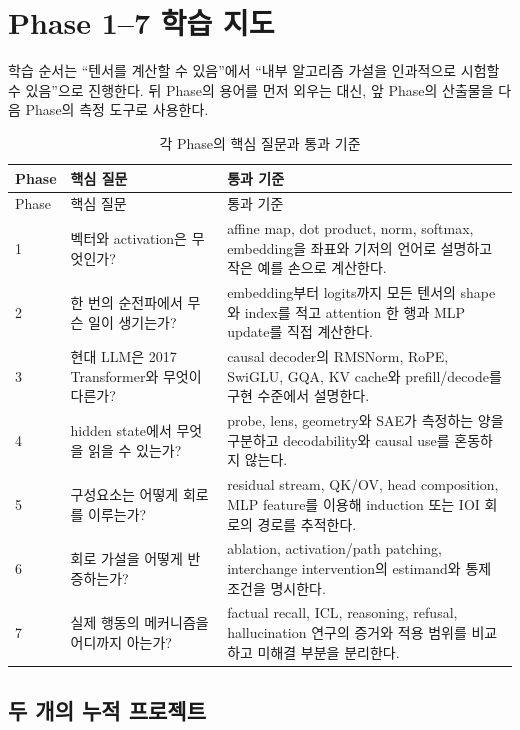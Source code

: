 \chapter*{Phase 1--7 학습 지도}

\begin{factbox}
학습 순서는 ``텐서를 계산할 수 있음''에서 ``내부 알고리즘 가설을 인과적으로 시험할 수 있음''으로 진행한다.
뒤 Phase의 용어를 먼저 외우는 대신, 앞 Phase의 산출물을 다음 Phase의 측정 도구로 사용한다.
\end{factbox}

\begin{longtable}{@{}p{}p{}p{}@{}}
\caption{각 Phase의 핵심 질문과 통과 기준}\label{tab:phase-roadmap}\\
\toprule
Phase & 핵심 질문 & 통과 기준 \\
\midrule
\endfirsthead
\toprule
Phase & 핵심 질문 & 통과 기준 \\
\midrule
\endhead
1 & 벡터와 activation은 무엇인가? & affine map, dot product, norm, softmax,
embedding을 좌표와 기저의 언어로 설명하고 작은 예를 손으로 계산한다. \\
2 & 한 번의 순전파에서 무슨 일이 생기는가? & embedding부터 logits까지 모든
텐서의 shape와 index를 적고 attention 한 행과 MLP update를 직접 계산한다. \\
3 & 현대 LLM은 2017 Transformer와 무엇이 다른가? & causal decoder의
RMSNorm, RoPE, SwiGLU, GQA, KV cache와 prefill/decode를 구현 수준에서 설명한다. \\
4 & hidden state에서 무엇을 읽을 수 있는가? & probe, lens, geometry와 SAE가
측정하는 양을 구분하고 decodability와 causal use를 혼동하지 않는다. \\
5 & 구성요소는 어떻게 회로를 이루는가? & residual stream, QK/OV, head
composition, MLP feature를 이용해 induction 또는 IOI 회로의 경로를 추적한다. \\
6 & 회로 가설을 어떻게 반증하는가? & ablation, activation/path patching,
interchange intervention의 estimand와 통제 조건을 명시한다. \\
7 & 실제 행동의 메커니즘을 어디까지 아는가? & factual recall, ICL, reasoning,
refusal, hallucination 연구의 증거와 적용 범위를 비교하고 미해결 부분을 분리한다. \\
\bottomrule
\end{longtable}

\section*{두 개의 누적 프로젝트}

